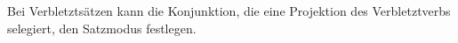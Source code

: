 Bei Verbletztsätzen kann die Konjunktion, die eine Projektion des Verbletztverbs selegiert, den
Satzmodus festlegen. 

